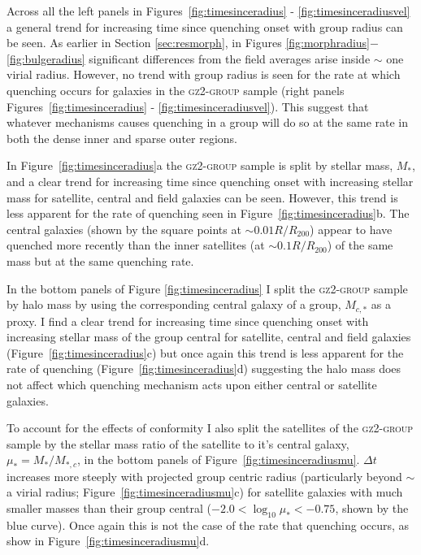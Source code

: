 Across all the left panels in Figures~\ref{fig:timesinceradius} - \ref{fig:timesinceradiusvel} a general trend for increasing time since quenching onset with group radius can be seen. As earlier in Section \ref{sec:resmorph}, in Figures \ref{fig:morphradius}$-$\ref{fig:bulgeradius} significant differences from the field averages arise inside $\sim$ one virial radius. However, no trend with group radius is seen for the rate at which quenching occurs for galaxies in the \textsc{gz2-group} sample (right panels Figures~\ref{fig:timesinceradius} - \ref{fig:timesinceradiusvel}). This suggest that whatever mechanisms causes quenching in a group will do so at the same rate in both the dense inner and sparse outer regions. 

In Figure~\ref{fig:timesinceradius}a the \textsc{gz2-group} sample is split by stellar mass, $M_*$, and a clear trend for increasing time since quenching onset with increasing stellar mass for satellite, central and field galaxies can be seen. However, this trend is less apparent for the rate of quenching seen in Figure~\ref{fig:timesinceradius}b. The central galaxies (shown by the square points at $\sim 0.01 R/R_{200}$) appear to have quenched more recently than the inner satellites (at $\sim0.1R/R_{200}$) of the same mass but at the same quenching rate. 

In the bottom panels of Figure \ref{fig:timesinceradius} I split the \textsc{gz2-group} sample by halo mass by using the corresponding central galaxy of a group, $M_{c,*}$ as a proxy. I find a clear trend for increasing time since quenching onset with increasing stellar mass of the group central for satellite, central and field galaxies (Figure~\ref{fig:timesinceradius}c) but once again this trend is less apparent for the rate of quenching (Figure~\ref{fig:timesinceradius}d) suggesting the halo mass does not affect which quenching mechanism acts upon either central or satellite galaxies. 

To account for the effects of conformity \citep[i.e. that satellites of higher mass tend to be found in higher mass halos]{citationbomb} I also split the satellites of the \textsc{gz2-group} sample by the stellar mass ratio of the satellite to it's central galaxy, $\mu_* = M_*/M_{*,c}$, in the bottom panels of Figure~\ref{fig:timesinceradiusmu}. $\Delta t $ increases more steeply with projected group centric radius (particularly beyond $\sim$ a virial radius; Figure~\ref{fig:timesinceradiusmu}c) for satellite galaxies with much smaller masses than their group central ($-2.0 < \log_{10}\mu_* < -0.75$, shown by the blue curve). Once again this is not the case of the rate that quenching occurs, as show in Figure~\ref{fig:timesinceradiusmu}d. 

